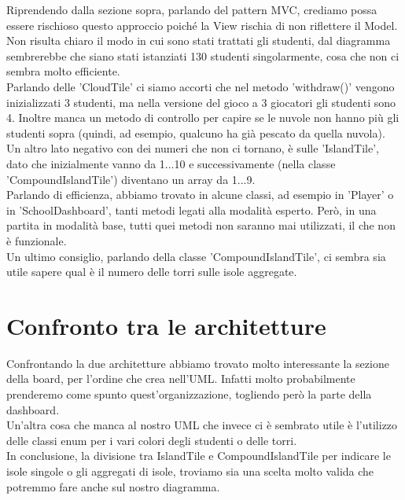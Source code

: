 \documentclass[12pt]{article}
\begin{document}
Riprendendo dalla sezione sopra, parlando del pattern MVC, crediamo possa essere rischioso questo approccio poiché la View rischia di non riflettere il Model.\\Non risulta chiaro il modo in cui sono stati trattati gli studenti, dal diagramma sembrerebbe che siano stati istanziati 130 studenti singolarmente, cosa che non ci sembra molto efficiente.\\Parlando delle 'CloudTile' ci siamo accorti che nel metodo 'withdraw()' vengono inizializzati 3 studenti, ma nella versione del gioco a 3 giocatori gli studenti sono 4. Inoltre manca un metodo di controllo per capire se le nuvole non hanno più gli studenti sopra (quindi, ad esempio, qualcuno ha già pescato da quella nuvola).\\Un altro lato negativo con dei numeri che non ci tornano, è sulle 'IslandTile', dato che inizialmente vanno da 1...10 e successivamente (nella classe 'CompoundIslandTile') diventano un array da 1...9.\\Parlando di efficienza, abbiamo trovato in alcune classi, ad esempio in 'Player' o in 'SchoolDashboard', tanti metodi legati alla modalità esperto. Però, in una partita in modalità base, tutti quei metodi non saranno mai utilizzati, il che non è funzionale.\\Un ultimo consiglio, parlando della classe 'CompoundIslandTile', ci sembra sia utile sapere qual è il numero delle torri sulle isole aggregate.



\section{Confronto tra le architetture}


Confrontando la due architetture abbiamo trovato molto interessante la sezione della board, per l'ordine che crea nell'UML. Infatti molto probabilmente prenderemo come spunto quest'organizzazione, togliendo però la parte della dashboard.\\Un'altra cosa che manca al nostro UML che invece ci è sembrato utile è l'utilizzo delle classi enum per i vari colori degli studenti o delle torri.\\In conclusione, la divisione tra IslandTile e CompoundIslandTile  per indicare le isole singole o gli aggregati di isole, troviamo sia una scelta molto valida che potremmo fare anche sul nostro diagramma.
\end{document}
